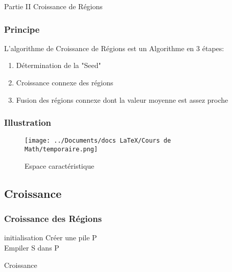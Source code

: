 \documentclass{beamer}
\begin{document}
\begin{frame}
\begin{block}{Partie II}
Croissance de Régions
\end{block}
\end{frame}

\begin{frame}
\frametitle{Principe}
L'algorithme de Croissance de Régions est un Algorithme en 3 étapes:
\begin{enumerate}
\item Détermination de la "Seed"
\item Croissance connexe des régions
\item Fusion des régions connexe dont la valeur moyenne est assez proche
\end{enumerate} 
\end{frame}

\begin{frame}
\frametitle{Illustration}
\begin{figure}
\texttt{[image: ../Documents/docs LaTeX/Cours de Math/temporaire.png]}
\caption{Espace caractéristique}
\end{figure}
\end{frame}

\subsection*{Croissance}

\begin{frame}
\frametitle{Croissance des Régions}
\scriptsize
\begin{algorithm}[H]
\SetAlgoLined
{}
initialisation\;
Créer une pile P\\
Empiler S dans P\\
	
\caption{Croissance}
\end{algorithm}
\end{frame}
\end{document}
